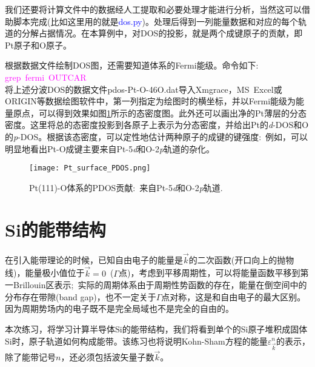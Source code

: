 我们还要将计算文件中的数据经人工提取和必要处理才能进行分析，当然这可以借助脚本完成(比如这里用的就是\textcolor{blue}{\textrm{dos.py}})。处理后得到一列能量数据和对应的每个轨道的分解占据情况。在本算例中，对\textrm{DOS}的投影，就是两个成键原子的贡献，即\textrm{Pt}原子和\textrm{O}原子。


根据数据文件绘制\textrm{DOS}图，还需要知道体系的\textrm{Fermi}能级。命令如下:\\
\textcolor{magenta}{\textrm{grep~fermi~OUTCAR}}\\
将上述分波\textrm{DOS}的数据文件\textrm{pdos-Pt-O-46O.dat}导入\textrm{Xmgrace}，\textrm{MS}~\textrm{Excel}或\textrm{ORIGIN}等数据绘图软件中，第一列指定为绘图时的横坐标，并以\textrm{Fermi}能级为能量原点，可以得到效果如图\ref{Pt_surface_PDOS}所示的态密度图。此外还可以画出净的\textrm{Pt}薄层的分态密度。这里将总的态密度投影到各原子上表示为分态密度，并给出\textrm{Pt}的\textit{d}-\textrm{DOS}和\textrm{O}的\textit{p}-DOS。根据该态密度，可以定性地估计两种原子的成键的键强度:~例如，可以明显地看出\textrm{Pt-O}成键主要来自\textrm{Pt}-5\textit{d}和\textrm{O}-2\textit{p}轨道的杂化。
\begin{figure}[h!]
\centering
\texttt{[image: Pt\_surface\_PDOS.png]}
\caption{\small \textrm{\textrm{Pt(111)-O}体系的\textrm{PDOS}贡献:~来自\textrm{Pt}-5\textit{d}和\textrm{O}-2\textit{p}轨道.}}%
\label{Pt_surface_PDOS}
\end{figure}

\section{Si的能带结构}\label{Sec:Si-band}
在引入能带理论的时候，已知自由电子的能量是$\vec k$的二次函数(开口向上的抛物线)，能量极小值位于$\vec k=0$~($\Gamma$点)，考虑到平移周期性，可以将能量函数平移到第一\textrm{Brillouin}区表示;~实际的周期体系由于周期性势函数的存在，能量在倒空间中的分布存在带隙\textrm{(band gap)}，也不一定关于$\Gamma$点对称，这是和自由电子的最大区别。因为周期势场内的电子既不是完全局域也不是完全的自由的。

本次练习，将学习计算半导体\textrm{Si}的能带结构，我们将看到单个的\textrm{Si}原子堆积成固体\textrm{Si}时，原子轨道如何构成能带。该练习也将说明\textrm{Kohn-Sham}方程的能量$\varepsilon_{\vec k}^n$的表示，除了能带记号$n$，还必须包括波矢量子数$\vec k$。
